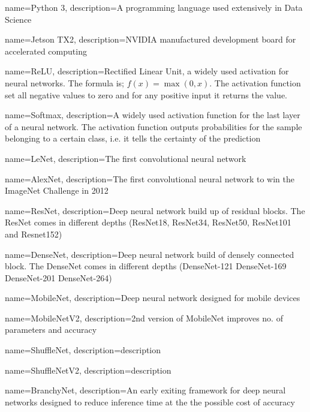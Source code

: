 {
	name=Python 3,
	description={A programming language used extensively in Data Science}
}

{
	name=Jetson TX2,
	description={NVIDIA manufactured development board for accelerated computing}
}


{
	name=ReLU,
	description={Rectified Linear Unit, a widely used activation for neural networks. The formula is; $f(x)=\max(0,x)$. The activation function set all negative values to zero and for any positive input it returns the value.}
}

{
	name=Softmax,
	description={A widely used activation function for the last layer of a neural network. The activation function outputs probabilities for the sample belonging to a certain class, i.e. it tells the certainty of the prediction}
}

{
	name={LeNet},
	description={The first convolutional neural network}
}

{
	name={AlexNet},
	description={The first convolutional neural network to win the ImageNet Challenge in 2012}
}

{
	name={ResNet},
	description={Deep neural network build up of residual blocks. The ResNet comes in different depths (ResNet18, ResNet34, ResNet50, ResNet101 and Resnet152)}
}

{
	name={DenseNet},
	description={Deep neural network build of densely connected block. The DenseNet comes in different depths (DenseNet-121 DenseNet-169 DenseNet-201 DenseNet-264)}
}

{
	name={MobileNet},
	description={Deep neural network designed for mobile devices}
}

{
	name={MobileNetV2},
	description={2nd version of MobileNet improves no. of parameters and accuracy}
}

{
	name={ShuffleNet},
	description={description}
}

{
	name={ShuffleNetV2},
	description={description}
}


{
	name={BranchyNet},
	description={An early exiting framework for deep neural networks designed to reduce inference time at the the possible cost of accuracy}
}

